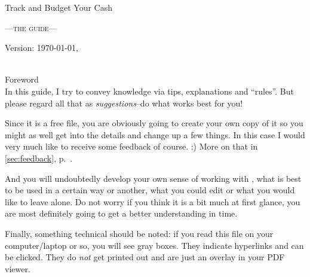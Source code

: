 
\begin{center}\LARGE
Track and Budget Your Cash
\end{center}
\begin{center}\scshape\large\sffamily
	---the guide---
\end{center}

\vfill
\begin{center}
Version: \today, \thistime
\end{center}

\clearpage
~\\
\vfill
{\sffamily\centering Foreword\label{foreword}\\}
\small\singlespacing\rmfamily
In this guide, I try to convey knowledge via tips, explanations and ``rules''.
But please regard all that as \emph{suggestions}--do what works best for you!

Since it is a free file, you are obviously going to create your own copy of it so you might as well get into the details and change up a few things. In this case I would very much like to receive some feedback of course. :)
More on that in \autoref{sec:feedback}, p.~\pageref{sec:feedback}.

And you will undoubtedly develop your own sense of working with \tfn, what is best to be used in a certain way or another, what you could edit or what you would like to leave alone.
Do not worry if you think it is a bit much at first glance, you are most definitely going to get a better understanding in time.

Finally, something technical should be noted: if you read this file on your computer/laptop or so, you will see gray boxes.
They indicate hyperlinks and can be clicked.
They do \emph{not} get printed out and are just an overlay in your PDF viewer.